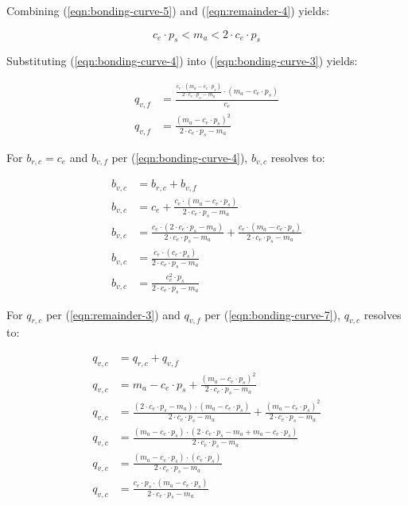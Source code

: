 \documentclass[table, twocolumn]{article}
\begin{document}
Combining (\ref{eqn:bonding-curve-5}) and (\ref{eqn:remainder-4}) yields:

\begin{equation} \label{eqn:bonding-curve-6}
  c_e \cdot p_s < m_a < 2 \cdot c_e \cdot p_s
\end{equation}

Substituting (\ref{eqn:bonding-curve-4}) into (\ref{eqn:bonding-curve-3}) yields:

\begin{align} \label{eqn:bonding-curve-7}
  q_{v, f} & =
  \frac{\frac{c_e \cdot (m_a - c_e \cdot p_s)}{2 \cdot c_e \cdot p_s - m_a}
  \cdot (m_a - c_e \cdot p_s)}{c_e} \nonumber                                \\
  q_{v, f} & = \frac{(m_a - c_e \cdot p_s) ^ 2}{2 \cdot c_e \cdot p_s - m_a}
\end{align}

For $b_{r, c} = c_e$ and $b_{v, f}$ per (\ref{eqn:bonding-curve-4}), $b_{v, c}$ resolves
to:

\begin{align} \label{eqn:bonding-curve-8}
  b_{v, c} & = b_{r, c} + b_{v, f} \nonumber                                          \\
  b_{v, c} & =
  c_e + \frac{c_e \cdot (m_a - c_e \cdot p_s)}{2 \cdot c_e \cdot p_s - m_a} \nonumber \\
  b_{v, c} & =
  \frac{c_e \cdot (2 \cdot c_e \cdot p_s - m_a)}{2 \cdot c_e \cdot p_s - m_a} +
  \frac{c_e \cdot (m_a - c_e \cdot p_s)}{2 \cdot c_e \cdot p_s - m_a} \nonumber       \\
  b_{v, c} & =
  \frac{c_e \cdot (c_e \cdot p_s)}{2 \cdot c_e \cdot p_s - m_a} \nonumber             \\
  b_{v, c} & = \frac{c_e ^ 2 \cdot p_s}{2 \cdot c_e \cdot p_s - m_a}
\end{align}

For $q_{r, c}$ per (\ref{eqn:remainder-3}) and $q_{v, f}$ per
(\ref{eqn:bonding-curve-7}), $q_{v, c}$ resolves to:

\begin{align} \label{eqn:bonding-curve-9}
  q_{v, c} & = q_{r, c} + q_{v, f} \nonumber                                   \\
  q_{v, c} & = m_a - c_e \cdot p_s +
  \frac{(m_a - c_e \cdot p_s) ^ 2}{2 \cdot c_e \cdot p_s - m_a} \nonumber      \\
  q_{v, c} & = \frac{(2 \cdot c_e \cdot p_s - m_a) \cdot(m_a - c_e \cdot p_s)}
  {2 \cdot c_e \cdot p_s - m_a} +
  \frac{(m_a - c_e \cdot p_s) ^ 2}{2 \cdot c_e \cdot p_s - m_a} \nonumber      \\
  q_{v, c} & =
  \frac{(m_a - c_e \cdot p_s) \cdot (2 \cdot c_e \cdot p_s - m_a + m_a - c_e \cdot p_s)}
  {2 \cdot c_e \cdot p_s - m_a} \nonumber                                      \\
  q_{v, c} & = \frac{(m_a - c_e \cdot p_s) \cdot (c_e \cdot p_s)}
  {2 \cdot c_e \cdot p_s - m_a} \nonumber                                      \\
  q_{v, c} & = \frac{c_e \cdot p_s \cdot(m_a - c_e \cdot p_s)}
  {2 \cdot c_e \cdot p_s - m_a}
\end{align}
\end{document}
